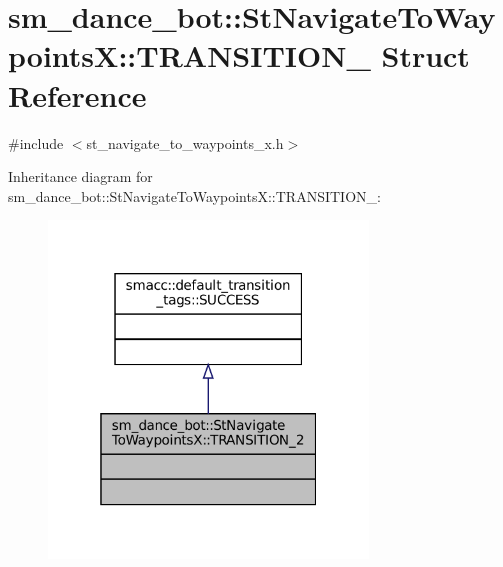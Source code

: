 \hypertarget{structsm__dance__bot_1_1StNavigateToWaypointsX_1_1TRANSITION__2}{}\section{sm\+\_\+dance\+\_\+bot\+:\+:St\+Navigate\+To\+WaypointsX\+:\+:T\+R\+A\+N\+S\+I\+T\+I\+O\+N\+\_ Struct Reference}
\label{structsm__dance__bot_1_1StNavigateToWaypointsX_1_1TRANSITION__2}


{\ttfamily \#include $<$st\+\_\+navigate\+\_\+to\+\_\+waypoints\+\_\+x.\+h$>$}



Inheritance diagram for sm\+\_\+dance\+\_\+bot\+:\+:St\+Navigate\+To\+WaypointsX\+:\+:T\+R\+A\+N\+S\+I\+T\+I\+O\+N\+\_\+:
\nopagebreak
\begin{figure}[H]
\begin{center}
\leavevmode
\includegraphics[width=241pt]{structsm__dance__bot_1_1StNavigateToWaypointsX_1_1TRANSITION__2__inherit__graph}
\end{center}
\end{figure}


